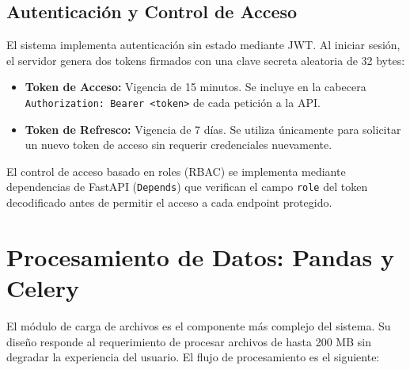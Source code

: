 \subsection{Autenticación y Control de Acceso}

El sistema implementa autenticación sin estado mediante JWT. Al iniciar sesión, el servidor genera dos tokens firmados con una clave secreta aleatoria de 32 bytes:

\begin{itemize}
    \item \textbf{Token de Acceso:} Vigencia de 15 minutos. Se incluye en la cabecera \texttt{Authorization: Bearer \textless token\textgreater} de cada petición a la API.
    \item \textbf{Token de Refresco:} Vigencia de 7 días. Se utiliza únicamente para solicitar un nuevo token de acceso sin requerir credenciales nuevamente.
\end{itemize}

El control de acceso basado en roles (RBAC) se implementa mediante dependencias de FastAPI (\texttt{Depends}) que verifican el campo \texttt{role} del token decodificado antes de permitir el acceso a cada endpoint protegido.

\section{Procesamiento de Datos: Pandas y Celery}

El módulo de carga de archivos es el componente más complejo del sistema. Su diseño responde al requerimiento de procesar archivos de hasta 200 MB sin degradar la experiencia del usuario. El flujo de procesamiento es el siguiente:

